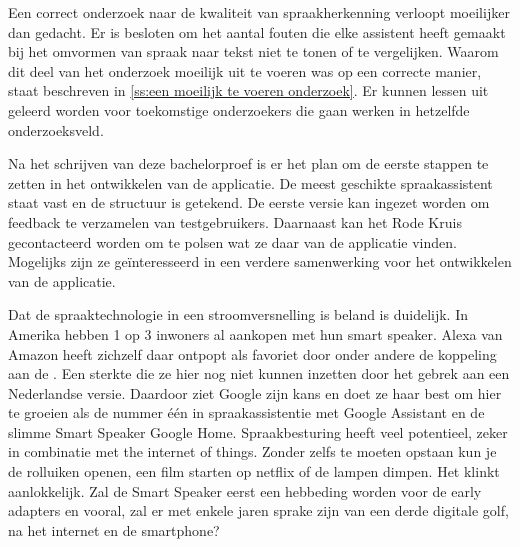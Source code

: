 Een correct onderzoek naar de kwaliteit van spraakherkenning verloopt moeilijker dan gedacht. Er is besloten om het aantal fouten die elke assistent heeft gemaakt bij het omvormen van spraak naar tekst niet te tonen of te vergelijken. Waarom dit deel van het onderzoek moeilijk uit te voeren was op een correcte manier, staat beschreven in \ref{ss:een moeilijk te voeren onderzoek}. Er kunnen lessen uit geleerd worden voor toekomstige onderzoekers die gaan werken in hetzelfde onderzoeksveld.

Na het schrijven van deze bachelorproef is er het plan om de eerste stappen te zetten in het ontwikkelen van de applicatie. De meest geschikte spraakassistent staat vast en de structuur is getekend. De eerste versie kan ingezet worden om feedback te verzamelen van testgebruikers. Daarnaast kan het Rode Kruis gecontacteerd worden om te polsen wat ze daar van de applicatie vinden. Mogelijks zijn ze geïnteresseerd in een verdere samenwerking voor het ontwikkelen van de applicatie.

Dat de spraaktechnologie in een stroomversnelling is beland is duidelijk. In Amerika hebben 1 op 3 inwoners al aankopen met hun smart speaker. Alexa van Amazon heeft zichzelf daar ontpopt als favoriet door onder andere de koppeling aan de . Een sterkte die ze hier nog niet kunnen inzetten door het gebrek aan een Nederlandse versie. Daardoor ziet Google zijn kans en doet ze haar best om hier te groeien als de nummer één in spraakassistentie met Google Assistant en de slimme Smart Speaker Google Home. Spraakbesturing heeft veel potentieel, zeker in combinatie met the internet of things. Zonder zelfs te moeten opstaan kun je de rolluiken openen, een film starten op netflix of de lampen dimpen. Het klinkt aanlokkelijk. Zal de Smart Speaker eerst een hebbeding worden voor de early adapters en vooral, zal er met enkele jaren sprake zijn van een derde digitale golf, na het internet en de smartphone?



 

